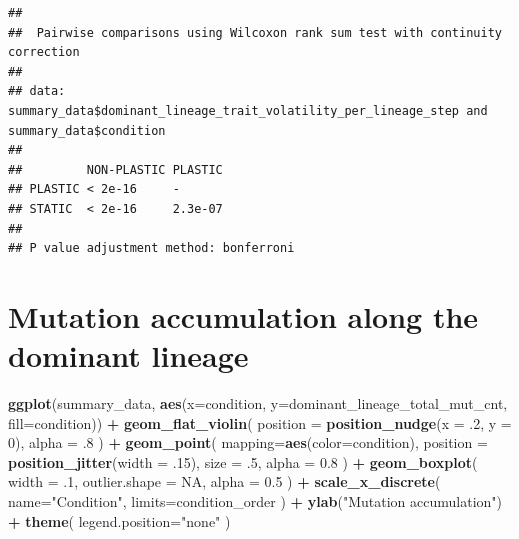 \documentclass[]{book}
\newenvironment{Shaded}{\begin{snugshade}}{\end{snugshade}}
\newcommand{\DataTypeTok}[1]{\textcolor[rgb]{0.13,0.29,0.53}{#1}}
\newcommand{\DecValTok}[1]{\textcolor[rgb]{0.00,0.00,0.81}{#1}}
\newcommand{\FloatTok}[1]{\textcolor[rgb]{0.00,0.00,0.81}{#1}}
\newcommand{\KeywordTok}[1]{\textcolor[rgb]{0.13,0.29,0.53}{\textbf{#1}}}
\newcommand{\NormalTok}[1]{#1}
\newcommand{\OperatorTok}[1]{\textcolor[rgb]{0.81,0.36,0.00}{\textbf{#1}}}
\newcommand{\OtherTok}[1]{\textcolor[rgb]{0.56,0.35,0.01}{#1}}
\newcommand{\StringTok}[1]{\textcolor[rgb]{0.31,0.60,0.02}{#1}}
\begin{document}
\begin{verbatim}
## 
##  Pairwise comparisons using Wilcoxon rank sum test with continuity correction 
## 
## data:  summary_data$dominant_lineage_trait_volatility_per_lineage_step and summary_data$condition 
## 
##         NON-PLASTIC PLASTIC
## PLASTIC < 2e-16     -      
## STATIC  < 2e-16     2.3e-07
## 
## P value adjustment method: bonferroni
\end{verbatim}

\hypertarget{mutation-accumulation-along-the-dominant-lineage}{%
\section{Mutation accumulation along the dominant lineage}\label{mutation-accumulation-along-the-dominant-lineage}}

\begin{Shaded}
\begin{Highlighting}[]
\KeywordTok{ggplot}\NormalTok{(summary_data, }\KeywordTok{aes}\NormalTok{(}\DataTypeTok{x=}\NormalTok{condition, }\DataTypeTok{y=}\NormalTok{dominant_lineage_total_mut_cnt, }\DataTypeTok{fill=}\NormalTok{condition)) }\OperatorTok{+}
\StringTok{  }\KeywordTok{geom_flat_violin}\NormalTok{(}
    \DataTypeTok{position =} \KeywordTok{position_nudge}\NormalTok{(}\DataTypeTok{x =} \FloatTok{.2}\NormalTok{, }\DataTypeTok{y =} \DecValTok{0}\NormalTok{),}
    \DataTypeTok{alpha =} \FloatTok{.8}
\NormalTok{  ) }\OperatorTok{+}
\StringTok{  }\KeywordTok{geom_point}\NormalTok{(}
    \DataTypeTok{mapping=}\KeywordTok{aes}\NormalTok{(}\DataTypeTok{color=}\NormalTok{condition),}
    \DataTypeTok{position =} \KeywordTok{position_jitter}\NormalTok{(}\DataTypeTok{width =} \FloatTok{.15}\NormalTok{),}
    \DataTypeTok{size =} \FloatTok{.5}\NormalTok{,}
    \DataTypeTok{alpha =} \FloatTok{0.8}
\NormalTok{  ) }\OperatorTok{+}
\StringTok{  }\KeywordTok{geom_boxplot}\NormalTok{(}
    \DataTypeTok{width =} \FloatTok{.1}\NormalTok{,}
    \DataTypeTok{outlier.shape =} \OtherTok{NA}\NormalTok{,}
    \DataTypeTok{alpha =} \FloatTok{0.5}
\NormalTok{  ) }\OperatorTok{+}
\StringTok{  }\KeywordTok{scale_x_discrete}\NormalTok{(}
    \DataTypeTok{name=}\StringTok{"Condition"}\NormalTok{,}
    \DataTypeTok{limits=}\NormalTok{condition_order}
\NormalTok{  ) }\OperatorTok{+}
\StringTok{  }\KeywordTok{ylab}\NormalTok{(}\StringTok{"Mutation accumulation"}\NormalTok{) }\OperatorTok{+}
\StringTok{  }\KeywordTok{theme}\NormalTok{(}
    \DataTypeTok{legend.position=}\StringTok{"none"}
\NormalTok{  )}
\end{Highlighting}
\end{Shaded}
\end{document}
